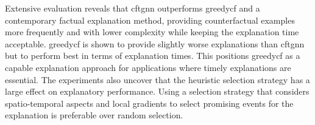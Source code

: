 Extensive evaluation reveals that \gls{cftgnn} outperforms \gls{greedycf} and a contemporary factual explanation method, providing counterfactual examples more frequently and with lower complexity while keeping the explanation time acceptable.
\gls{greedycf} is shown to provide slightly worse explanations than \gls{cftgnn} but to perform best in terms of explanation times. This positions \gls{greedycf} as a capable explanation approach for applications where timely explanations are essential. The experiments also uncover that the heuristic selection strategy has a large effect on explanatory performance. Using a selection strategy that considers spatio-temporal aspects and local gradients to select promising events for the explanation is preferable over random selection.




